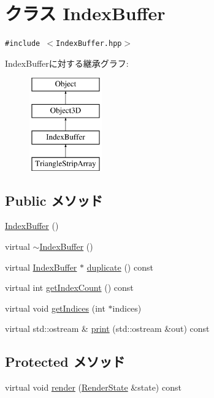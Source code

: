\hypertarget{classm3g_1_1IndexBuffer}{
\section{クラス IndexBuffer}
\label{classm3g_1_1IndexBuffer}
}
{\tt \#include $<$IndexBuffer.hpp$>$}

IndexBufferに対する継承グラフ:\begin{figure}[H]
\begin{center}
\leavevmode
\includegraphics[height=4cm]{classm3g_1_1IndexBuffer}
\end{center}
\end{figure}
\subsection*{Public メソッド}
\begin{CompactItemize}
\item 
\hyperlink{classm3g_1_1IndexBuffer_d2e68a2d7c6c753d3abfeef42ee79427}{IndexBuffer} ()
\item 
virtual \hyperlink{classm3g_1_1IndexBuffer_ac7952364fe4d2d7b2731da5380c841c}{$\sim$IndexBuffer} ()
\item 
virtual \hyperlink{classm3g_1_1IndexBuffer}{IndexBuffer} $\ast$ \hyperlink{classm3g_1_1IndexBuffer_fab6fc0a0ec393e527f849c3af10ad76}{duplicate} () const 
\item 
virtual int \hyperlink{classm3g_1_1IndexBuffer_fe9ae2993ebcdb93d5ff26d57c81b73e}{getIndexCount} () const 
\item 
virtual void \hyperlink{classm3g_1_1IndexBuffer_650953afac45099025a524ab160b911f}{getIndices} (int $\ast$indices)
\item 
virtual std::ostream \& \hyperlink{classm3g_1_1IndexBuffer_6fea17fa1532df3794f8cb39cb4f911f}{print} (std::ostream \&out) const 
\end{CompactItemize}
\subsection*{Protected メソッド}
\begin{CompactItemize}
\item 
virtual void \hyperlink{classm3g_1_1IndexBuffer_8babc8a79b78615da51161e94029eea9}{render} (\hyperlink{structm3g_1_1RenderState}{RenderState} \&state) const 
\end{CompactItemize}
